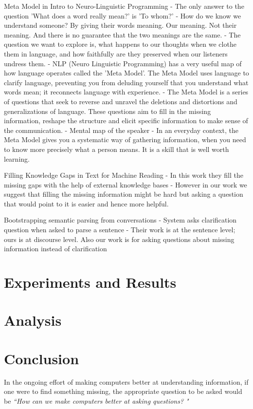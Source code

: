 \documentclass[11pt]{article}
\begin{document}
Meta Model in Intro to Neuro-Linguistic Programming
- The only answer to the question 'What does a word really mean?' is 'To whom?'
- How do we know we understand someone? By giving their words meaning. Our meaning. Not  their meaning. And there is no guarantee that the two meanings are the same.
- The question we want to explore is, what happens to our thoughts when we clothe them in language, and how faithfully are they preserved when our listeners undress them.
- NLP (Neuro Linguistic Programming) has a very useful map of how language operates called the 'Meta Model'. The Meta Model uses language to clarify language, preventing you from deluding yourself that you understand what words mean; it reconnects language with experience.
- The Meta Model is a series of questions that seek to reverse and unravel the deletions and distortions and generalizations of language. These questions aim to fill in the missing information, reshape the structure and elicit specific information to make sense of the communication.
- Mental map of the speaker
- In an everyday context, the Meta Model gives you a systematic way of gathering information, when you need to know more precisely what a person means. It is a skill that is well worth learning.

Filling Knowledge Gaps in Text for Machine Reading
- In this work they fill the missing gaps with the help of external knowledge bases
- However in our work we suggest that filling the missing information might be hard but asking a question that would point to it is easier and hence more helpful.

Bootstrapping semantic parsing from conversations
- System asks clarification question when asked to parse a sentence 
- Their work is at the sentence level; ours is at discourse level. Also our work is for asking questions about missing information instead of clarification




\section{Experiments and Results}\label{experiments_results}

\section{Analysis}

\section{Conclusion}

In the ongoing effort of making computers better at understanding information, if one were to find something missing, the appropriate question to be asked would be \textit{``How can we make computers better at asking questions? "}

\fi


\end{document}

